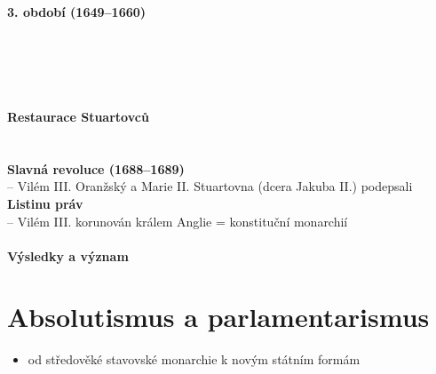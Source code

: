 \indent {} \\ 
\indent {} \\ 
\indent {} \\ 
\indent {} \\ 
\textbf{3. období (1649--1660)} \\ 
\indent {} \\ 
\indent {} \\ 
\indent {} \\ 
\indent {} \\ 
\indent {} \\ 
\textbf{Restaurace Stuartovců} \\ 
\indent {} \\ 
\indent {} \\ 
\textbf{Slavná revoluce (1688--1689)} \\ 
\indent {} -- Vilém III. Oranžský a Marie II. Stuartovna (dcera Jakuba II.) podepsali \textbf{Listinu práv} \\ 
\indent {} -- Vilém III. korunován králem \ra Anglie = konstituční monarchií
 \\ 
\indent {} \\ 
\textbf{Výsledky a význam} \\ 
\newpage





\section{Absolutismus a parlamentarismus}
\begin{itemize}
\item od středověké stavovské monarchie k novým státním formám
\end{itemize}


